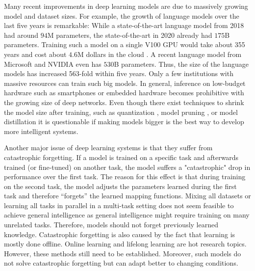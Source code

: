 Many recent improvements in deep learning models are due to massively growing model and dataset sizes.
For example, the growth of language models over the last five years is remarkable:
While a state-of-the-art language model from 2018  had around \(94\)M parameters, the state-of-the-art in 2020  already had \(175\)B parameters. Training such a model on a single V100 GPU would take about 355 years and cost about \(4.6\)M dollars in the cloud .
A recent language model from Microsoft and NVIDIA  even has \(530\)B parameters.
Thus, the size of the language models has increased 563-fold within five years.
Only a few institutions with massive resources can train such big models.
In general, inference on low-budget hardware such as smartphones or embedded hardware becomes prohibitive with the growing size of deep networks.
Even though there exist techniques to shrink the model size after training, such as quantization \cite{Wu_Judd_Zhang_Isaev_Micikevicius_2020}, model pruning \cite{Choudhary_Mishra_Goswami_Sarangapani_2020}, or model distillation \cite{Hinton_Vinyals_Dean_2015} it is questionable if making models bigger is the best way to develop more intelligent systems.

Another major issue of deep learning systems is that they suffer from catastrophic forgetting.
If a model is trained on a specific task and afterwards trained (or fine-tuned) on another task, the model suffers a "catastrophic" drop in performance over the first task.
The reason for this effect is that during training on the second task, the model adjusts the parameters learned during the first task and therefore ``forgets'' the learned mapping functions.
Mixing all datasets or learning all tasks in parallel in a multi-task setting \cite{Zhang_Yang_2021} does not seem feasible to achieve general intelligence as general intelligence might require training on many unrelated tasks. Therefore, models should not forget previously learned knowledge.
Catastrophic forgetting is also caused by the fact that learning is mostly done offline.
Online learning \cite{Sahoo_Pham_Lu_Hoi_2017} and lifelong learning \cite{Parisi_Kemker_Part_Kanan_Wermter_2019} are hot research topics.
However, these methods still need to be established. Moreover, such models do not solve catastrophic forgetting but can adapt better to changing conditions.


